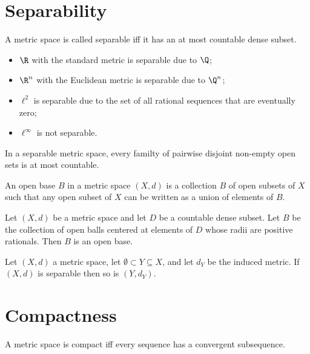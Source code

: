 \documentclass{article}
\begin{document}
\section{Separability}

\begin{definition}
	A metric space is called separable iff it has an at most countable dense subset.
\end{definition}
\begin{itemize}
	\item $\R$ with the standard metric is separable due to $\Q$;
	\item $\R^n$ with the Euclidean metric is separable due to $\Q^n$;
	\item $\ell^2$ is separable due to the set of all rational sequences that are eventually zero;
	\item $\ell^\infty$ is not separable.
\end{itemize}

\begin{proposition}[8.3]
	In a separable metric space, every familty of pairwise disjoint non-empty open
	sets is at most countable.
\end{proposition}

\begin{definition}
	An open base $B$ in a metric space $(X,d)$ is a collection $B$ of open subsets
	of $X$ such that any open subset of $X$ can be written as a union of elements of $B$.
\end{definition}

\begin{proposition}[8.5]
	Let $(X,d)$ be a metric space and let $D$ be a countable dense subset. Let $B$
	be the collection of open balls centered at elements of $D$ whose radii are positive
	rationals. Then $B$ is an open base.
\end{proposition}

\begin{proposition}[8.6]
	Let $(X,d)$ a metric space, let $\emptyset\subset Y\subseteq X$, and let
	$d_Y$ be the induced metric. If $(X,d)$ is separable then so is $(Y,d_Y)$.
\end{proposition}

\section{Compactness}

\begin{definition}
	A metric space is compact iff every sequence has a convergent subsequence.
\end{definition}
\end{document}
